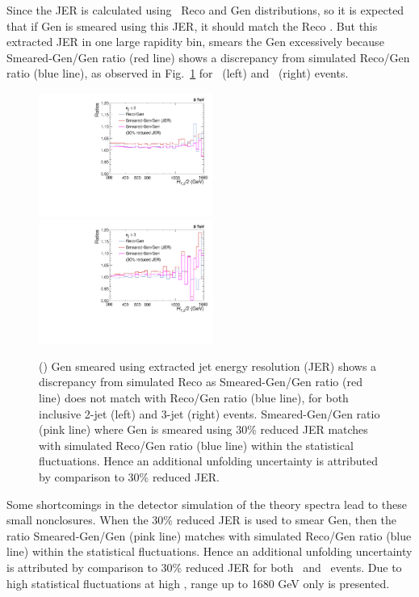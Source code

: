 Since the JER is calculated using \MGP~Reco and Gen \httwo distributions, so it is expected that if Gen \httwo is smeared using this JER, it should match the Reco \httwo. But this extracted JER in one large rapidity bin, smears the Gen \httwo excessively because Smeared-Gen/Gen ratio (red line) shows a discrepancy from simulated Reco/Gen ratio (blue line), as observed in Fig.~\ref{fig:ratios} for \njt~(left) and \njth~(right) events.\begin{figure}[!h]
 \begin{center}
 \hspace*{-5mm}\includegraphics[width=0.51\textwidth]{Plots_HT_2_150/Ratio_Reco_2_crystal.pdf}%
 ~~\includegraphics[width=0.51\textwidth]{Plots_HT_2_150/Ratio_Reco_3_crystal.pdf}
 \caption[Additional unfolding uncertainty.]{\MadGraphFn\plusn \PYTHIAS (\MGP) Gen smeared using extracted jet energy resolution (JER) shows a discrepancy from simulated Reco as Smeared-Gen/Gen ratio (red line) does not match with Reco/Gen ratio (blue line), for both inclusive 2-jet (left) and 3-jet (right) events. Smeared-Gen/Gen ratio (pink line) where Gen is smeared using 30\% reduced JER matches with simulated Reco/Gen ratio (blue line) within the statistical fluctuations. Hence an additional unfolding uncertainty is attributed by comparison to 30\% reduced JER.}
 \label{fig:ratios}
 \end{center}
\end{figure} Some shortcomings in the detector simulation of the theory spectra lead to these small nonclosures. When the 30\% reduced JER is used to smear Gen, then the ratio Smeared-Gen/Gen (pink line) matches with simulated Reco/Gen ratio (blue line) within the statistical fluctuations. Hence an additional unfolding uncertainty is attributed by comparison to 30\% reduced JER for both \njt~and \njth~events. Due to high statistical fluctuations at high \httwons, range up to 1680 GeV only is presented.

